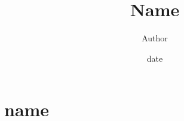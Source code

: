 \documentclass[11pt, letterpaper]{article}
\title{Name}
\author{Author}
\date{date}
\begin{document}
\part{name}
\end{document}
